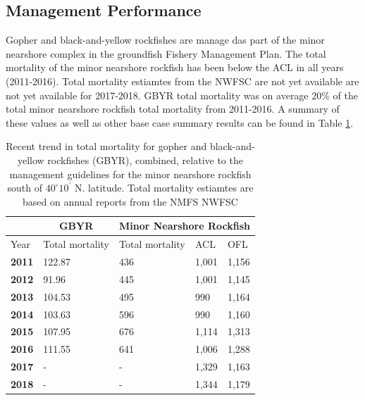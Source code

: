 \documentclass[12pt,]{article}
\begin{document}
\FloatBarrier

\subsection*{Management Performance}\label{management-performance}

Gopher and black-and-yellow rockfishes are manage das part of the minor
nearshore complex in the groundfish Fishery Management Plan. The total
mortality of the minor nearshore rockfish has been below the ACL in all
years (2011-2016). Total mortality estiamtes from the NWFSC are not yet
available are not yet available for 2017-2018. GBYR total mortality was
on average 20\% of the total minor nearshore rockfish total mortality
from 2011-2016. A summary of these values as well as other base case
summary results can be found in Table \ref{tab:mnmgt_perform}.

\begin{table}[ht]
\centering
\caption{Recent trend in total mortality for gopher and 
                            black-and-yellow rockfishes (GBYR), combined, relative to the 
                             management guidelines for the minor nearshore rockfish 
                             south of $40^\circ 10^\prime$ N. latitude. 
                             Total mortality estiamtes are based on annual reports 
                                from the NMFS NWFSC} 
\label{tab:mnmgt_perform}
\begin{tabular}{lllll}
  \hline
   \multicolumn{1}{c}{} & \multicolumn{1}{c}{GBYR} & \multicolumn{3}{c}{Minor Nearshore Rockfish} \\  \cmidrule(lr){2-2} \cmidrule(lr){3-5}
   \hline
Year & Total mortality & Total mortality & ACL & OFL \\ 
  \hline
\textbf{2011} & 122.87 & 436 & 1,001 & 1,156 \\ 
  \textbf{2012} & 91.96 & 445 & 1,001 & 1,145 \\ 
  \textbf{2013} & 104.53 & 495 & 990 & 1,164 \\ 
  \textbf{2014} & 103.63 & 596 & 990 & 1,160 \\ 
  \textbf{2015} & 107.95 & 676 & 1,114 & 1,313 \\ 
  \textbf{2016} & 111.55 & 641 & 1,006 & 1,288 \\ 
  \textbf{2017} & - & - & 1,329 & 1,163 \\ 
  \textbf{2018} & - & - & 1,344 & 1,179 \\ 
   \hline
   \hline
\end{tabular}
\end{table}
\end{document}
